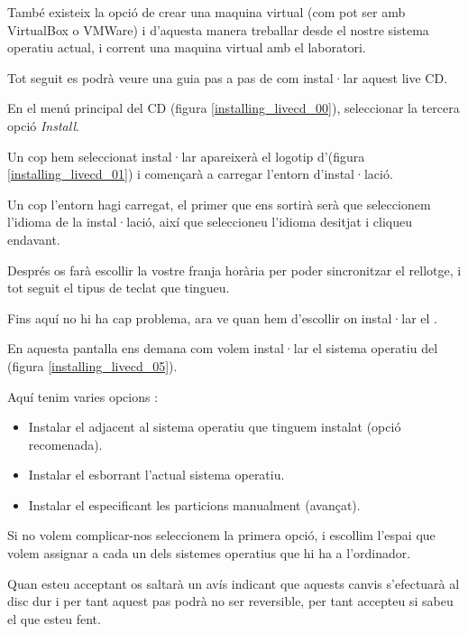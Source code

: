 També existeix la opció de crear una maquina virtual (com pot ser amb VirtualBox o VMWare) i d'aquesta manera treballar desde el nostre sistema operatiu actual, i corrent una maquina virtual amb el laboratori.

Tot seguit es podrà veure una guia pas a pas de com instal·lar aquest live CD.

En el menú principal del CD (figura \ref{installing_livecd_00}), seleccionar la tercera opció \emph{Install}.


Un cop hem seleccionat instal·lar apareixerà el logotip d'\Ubuntu (figura \ref{installing_livecd_01}) i començarà a carregar l'entorn d'instal·lació.


Un cop l'entorn hagi carregat, el primer que ens sortirà serà que seleccionem l'idioma de la instal·lació, així que seleccioneu l'idioma desitjat i cliqueu endavant.

Després os farà escollir la vostre franja horària per poder sincronitzar el rellotge, i tot seguit el tipus de teclat que tingueu.

Fins aquí no hi ha cap problema, ara ve quan hem d'escollir on instal·lar el \LiveCD. 

En aquesta pantalla ens demana com volem instal·lar el sistema operatiu del \LiveCD (figura \ref{installing_livecd_05}).

Aquí tenim varies opcions :

\begin{itemize}
	\item Instalar el \LiveCD adjacent al sistema operatiu que tinguem instalat (opció recomenada).
	\item Instalar el \LiveCD esborrant l'actual sistema operatiu.
	\item Instalar el \LiveCD especificant les particions manualment (avançat).
\end{itemize}

Si no volem complicar-nos seleccionem la primera opció, i escollim l'espai que volem assignar a cada un dels sistemes operatius que hi ha a l'ordinador.


Quan esteu acceptant os saltarà un avís indicant que aquests canvis s'efectuarà al disc dur i per tant aquest pas podrà no ser reversible, per tant accepteu si sabeu el que esteu fent.

